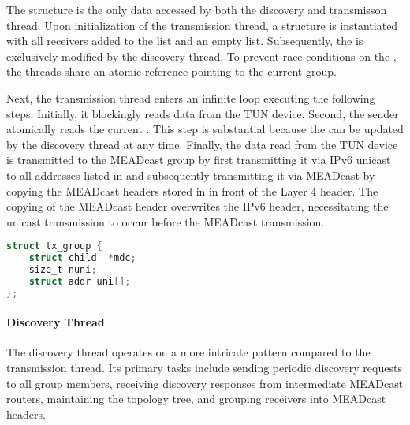 The  structure is the only data accessed by both the
    discovery and transmisson thread.
Upon initialization of the transmission thread, a 
    structure is instantiated with all receivers added to the 
    list and an empty  list.
Subsequently, the  is exclusively modified by the discovery
    thread.
To prevent race conditions on the , the threads share an
    atomic reference pointing to the current group.

Next, the transmission thread enters an infinite loop executing the following
    steps.
Initially, it blockingly reads data from the TUN device.
Second, the sender atomically reads the current .
This step is substantial because the  can be updated by
    the discovery thread at any time.
Finally, the data read from the TUN device is transmitted to the MEADcast group
    by first transmitting it via IPv6 unicast to all addresses listed in
     and subsequently transmitting it via MEADcast by copying
    the MEADcast headers stored in  in front of the Layer 4
    header.
The copying of the MEADcast header overwrites the IPv6 header, necessitating
    the unicast transmission to occur before the MEADcast transmission.

\begin{lstlisting}[language=C, caption={Sender: tx\_group structure}, label={lst:txg_struct}]
struct tx_group {
    struct child  *mdc;
    size_t nuni;
    struct addr uni[];
};
\end{lstlisting}


\paragraph{Discovery Thread} %
\label{par:Discovery Thread}

The discovery thread operates on a more intricate pattern compared to the
    transmission thread.
Its primary tasks include sending periodic discovery requests to all group
    members, receiving discovery responses from intermediate MEADcast routers,
    maintaining the topology tree, and grouping receivers into MEADcast
    headers.

